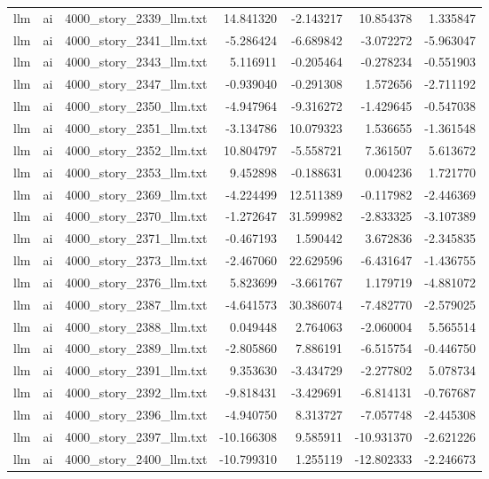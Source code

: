 \begin{longtable}{lllrrrr}
llm & ai & 4000\_story\_2339\_llm.txt & 14.841320 & -2.143217 & 10.854378 & 1.335847 \\
llm & ai & 4000\_story\_2341\_llm.txt & -5.286424 & -6.689842 & -3.072272 & -5.963047 \\
llm & ai & 4000\_story\_2343\_llm.txt & 5.116911 & -0.205464 & -0.278234 & -0.551903 \\
llm & ai & 4000\_story\_2347\_llm.txt & -0.939040 & -0.291308 & 1.572656 & -2.711192 \\
llm & ai & 4000\_story\_2350\_llm.txt & -4.947964 & -9.316272 & -1.429645 & -0.547038 \\
llm & ai & 4000\_story\_2351\_llm.txt & -3.134786 & 10.079323 & 1.536655 & -1.361548 \\
llm & ai & 4000\_story\_2352\_llm.txt & 10.804797 & -5.558721 & 7.361507 & 5.613672 \\
llm & ai & 4000\_story\_2353\_llm.txt & 9.452898 & -0.188631 & 0.004236 & 1.721770 \\
llm & ai & 4000\_story\_2369\_llm.txt & -4.224499 & 12.511389 & -0.117982 & -2.446369 \\
llm & ai & 4000\_story\_2370\_llm.txt & -1.272647 & 31.599982 & -2.833325 & -3.107389 \\
llm & ai & 4000\_story\_2371\_llm.txt & -0.467193 & 1.590442 & 3.672836 & -2.345835 \\
llm & ai & 4000\_story\_2373\_llm.txt & -2.467060 & 22.629596 & -6.431647 & -1.436755 \\
llm & ai & 4000\_story\_2376\_llm.txt & 5.823699 & -3.661767 & 1.179719 & -4.881072 \\
llm & ai & 4000\_story\_2387\_llm.txt & -4.641573 & 30.386074 & -7.482770 & -2.579025 \\
llm & ai & 4000\_story\_2388\_llm.txt & 0.049448 & 2.764063 & -2.060004 & 5.565514 \\
llm & ai & 4000\_story\_2389\_llm.txt & -2.805860 & 7.886191 & -6.515754 & -0.446750 \\
llm & ai & 4000\_story\_2391\_llm.txt & 9.353630 & -3.434729 & -2.277802 & 5.078734 \\
llm & ai & 4000\_story\_2392\_llm.txt & -9.818431 & -3.429691 & -6.814131 & -0.767687 \\
llm & ai & 4000\_story\_2396\_llm.txt & -4.940750 & 8.313727 & -7.057748 & -2.445308 \\
llm & ai & 4000\_story\_2397\_llm.txt & -10.166308 & 9.585911 & -10.931370 & -2.621226 \\
llm & ai & 4000\_story\_2400\_llm.txt & -10.799310 & 1.255119 & -12.802333 & -2.246673 \\

\end{longtable}
